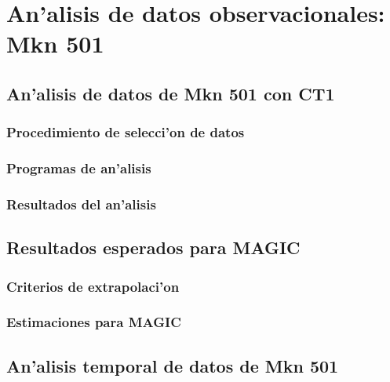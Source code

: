 

\chapter{An'alisis de datos observacionales: Mkn 501}
\label{chapter:mkn501}

\section{An'alisis de datos de Mkn 501 con CT1}

\subsection{Procedimiento de selecci'on de datos}

\subsection{Programas de an'alisis}

\subsection{Resultados del an'alisis}

\section{Resultados esperados para MAGIC}

\subsection{Criterios de extrapolaci'on}

\subsection{Estimaciones para MAGIC}

\section{An'alisis temporal de datos de Mkn 501}

